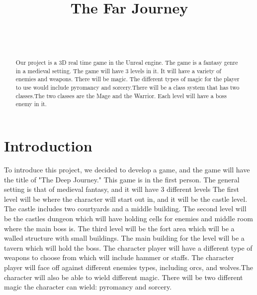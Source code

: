 \documentclass{sigchi}
\def\plaintitle{The Far Journey}
\begin{document}
\title{\plaintitle}

\author{%
  \\
  \\
  }

\maketitle

\begin{abstract}
 Our project is a 3D real time game in the Unreal engine. 
  The game is a fantasy genre in a medieval setting. The game will have 3 levels in it.
  It will have a variety of enemies and weapons. There will be magic. The different types of magic for the player to use would include pyromancy and sorcery.There will be a class system that has two classes.The two classes are the Mage and the Warrior. Each level will have a boss enemy in it.
   \end{abstract}



\section{Introduction}
To introduce this project, we decided to develop a game, and the game will have the title of "The Deep Journey." This game is in the first person. The general setting is that of medieval fantasy, and it will have 3 different levels The first level will be where the character will start out in, and it will be the castle level. The castle includes two courtyards and a middle building. The second level will be the castles dungeon which will have holding cells for enemies and middle room where the main boss is. The third level will be the fort area which will be a walled structure with small buildings. The main building for the level will be a tavern which will hold the boss. The character player will have a different type of weapons to choose from which will include hammer or staffs. The character player will face off against different enemies types, including orcs, and wolves.The character will also be able to wield different magic. There will be two different magic the character can wield: pyromancy and sorcery. 
\end{document}
